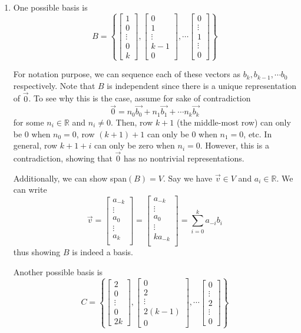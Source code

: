 \documentclass[11pt]{article}
\newcommand{\vect}[1]{\begin{bmatrix}#1\end{bmatrix}}
\newcommand{\R}{\mathbb{R}}
\begin{document}
\begin{enumerate}[label=\arabic*.]
\begin{proof}
\begin{enumerate}
        \end{enumerate}\end{proof}  

        \item One possible basis is 
        $$B=\left\{\vect{1 \\ 0 \\ \vdots \\0 \\ k}, \vect{0 \\ 1 \\ \vdots \\k-1 \\ 0}, \cdots \vect{0 \\ \vdots \\ 1 \\ \vdots \\ 0}\right\}$$
        
        For notation purpose, we can sequence each of these vectors as $b_k, b_{k-1}, \cdots b_0$ respectively. Note that $B$ is independent since there is a unique representation of $\vec{0}$. To see why this is the case, assume for sake of contradiction
        $$\vec{0} = n_0\vec{b_0} + n_1\vec{b_1}+ \cdots n_k\vec{b_k}$$
        for some $n_i \in \R$ and $n_i\neq 0$. Then, row $k+1$ (the middle-most row) can only be $0$ when $n_0=0$, row $(k+1)+1$ can only be $0$ when $n_1 =0$, etc. In general, row $k+1+i$ can only be zero when $n_i=0$. However, this is a contradiction, showing that $\vec{0}$ has no nontrivial representations. 
        
        Additionally, we can show span$(B) =V$. Say we have $\vec{v}\in V$ and $a_i \in\R$. We can write
        $$\vec{v} = \vect{a_{-k} \\ \vdots \\a_0 \\ \vdots \\ a_k \\} = \vect{a_{-k} \\ \vdots \\a_0 \\ \vdots \\ k a_{-k} \\} = \sum^k_{i=0} a_{-i}b_i$$
        thus showing $B$ is indeed a basis.

        Another possible basis is 
        $$C=\left\{\vect{2 \\ 0 \\ \vdots \\0 \\ 2k}, \vect{0 \\ 2 \\ \vdots \\2(k-1) \\ 0}, \cdots \vect{0 \\ \vdots \\ 2 \\ \vdots \\ 0}\right\}$$


\end{enumerate}
\end{document}
